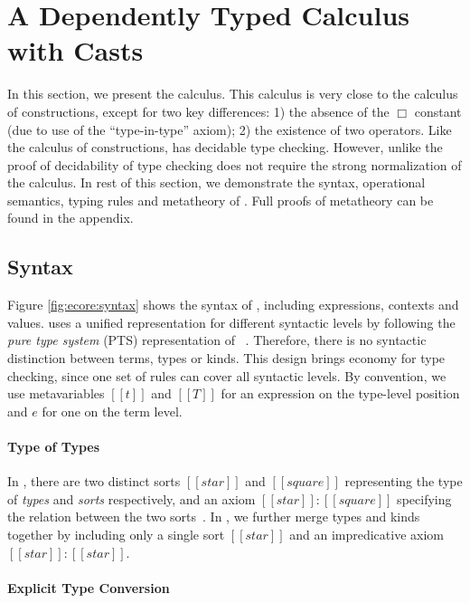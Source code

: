 
\section{A Dependently Typed Calculus with Casts}\label{sec:ecore}

In this section, we present the \ecore calculus. This calculus is very
close to the calculus of constructions, except for two key differences:
1) the absence of the $\Box$ constant (due to use of the
``type-in-type'' axiom); 2) the existence of two \cast operators. Like
the calculus of constructions, \ecore has decidable
type checking. However, unlike \cc the proof of decidability of
type checking does not require the strong normalization of the
calculus.  In rest of this section, we demonstrate the syntax,
operational semantics, typing rules and metatheory of \ecore.
Full proofs of metatheory can be found in the appendix.

\subsection{Syntax}\label{sec:ecore:syn}

Figure \ref{fig:ecore:syntax} shows the syntax of \ecore, including
expressions, contexts and values. \ecore uses a unified 
representation for different syntactic levels by following the
\emph{pure type system} (PTS) representation of \cc~\cite{handbook}. Therefore, there
is no syntactic distinction between terms, types or kinds. This design
brings economy for type checking, since one set of rules can cover
all syntactic levels. By convention, we use metavariables $[[t]]$ and
$[[T]]$ for an expression on the type-level position and $e$ for one
on the term level.

\paragraph{Type of Types}
In \cc, there are two distinct sorts $[[star]]$ and
$[[square]]$ representing the type of \emph{types} and \emph{sorts}
respectively, and an axiom $[[star]]:[[square]]$ specifying the
relation between the two sorts~\cite{handbook}. In \ecore, we further merge types and
kinds together by including only a single sort $[[star]]$ and an
impredicative axiom $[[star]]:[[star]]$.

\paragraph{Explicit Type Conversion}

